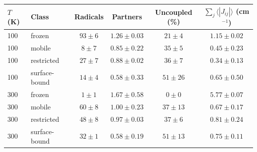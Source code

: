 \begin{tabular}{llcccc}
\toprule
$T$ (K) & Class & Radicals & Partners & Uncoupled (\%) & $\sum_j\langle|J_{ij}|\rangle$ (cm$^{-1}$)\\
\midrule
100 & frozen & $93\pm6$ & $1.26\pm0.03$ & $21\pm4$ & $1.15\pm0.02$\\
100 & mobile & $8\pm7$ & $0.85\pm0.22$ & $35\pm5$ & $0.45\pm0.23$\\
100 & restricted & $27\pm7$ & $0.88\pm0.02$ & $36\pm7$ & $0.34\pm0.13$\\
100 & surface-bound & $14\pm4$ & $0.58\pm0.33$ & $51\pm26$ & $0.65\pm0.50$\\
300 & frozen & $1\pm1$ & $1.67\pm0.58$ & $0\pm0$ & $5.77\pm0.07$\\
300 & mobile & $60\pm8$ & $1.00\pm0.23$ & $37\pm13$ & $0.67\pm0.17$\\
300 & restricted & $48\pm8$ & $0.97\pm0.03$ & $37\pm6$ & $0.81\pm0.24$\\
300 & surface-bound & $32\pm1$ & $0.58\pm0.19$ & $51\pm13$ & $0.75\pm0.11$\\
\bottomrule
\end{tabular}
